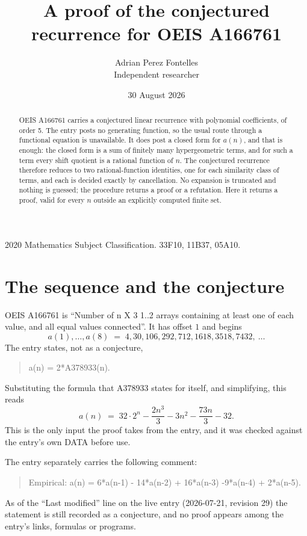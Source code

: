 \documentclass[11pt,a4paper]{article}
\title{A proof of the conjectured recurrence for OEIS A166761}
\author{Adrian Perez Fontelles\\ \small Independent researcher}
\date{30 August 2026}
\theoremstyle{plain}
\theoremstyle{definition}
\begin{document}
\maketitle

\begin{abstract}
OEIS A166761 carries a conjectured linear recurrence with polynomial coefficients, of
order 5. The entry posts no generating function, so the usual route through a
functional equation is unavailable. It does post a closed form for $a(n)$, and that is
enough: the closed form is a sum of finitely many hypergeometric terms, and for such a
term every shift quotient is a rational function of $n$. The conjectured recurrence
therefore reduces to two rational-function identities, one for each similarity
class of terms, and each is decided exactly by cancellation. No expansion is truncated and
nothing is guessed; the procedure returns a proof or a refutation. Here it returns a proof,
valid for every $n$ outside an explicitly computed finite set.
\end{abstract}

\noindent\small 2020 Mathematics Subject Classification. 33F10, 11B37, 05A10.\normalsize

\section{The sequence and the conjecture}

OEIS A166761 is ``Number of n X 3 1..2 arrays containing at least one of each value, and all equal values connected''. It has offset $1$ and begins
\[
a(1),\dots,a(8)\;=\;4, 30, 106, 292, 712, 1618, 3518, 7432,\ \dots
\]
The entry states, not as a conjecture,
\begin{quote}\small
a(n) = 2*A378933(n).
\end{quote}
Substituting the formula that A378933 states for itself, and simplifying, this reads
\begin{equation}\label{eq:cf}
a(n)\;=\;32 \cdot 2^{n} - \frac{2 n^{3}}{3} - 3 n^{2} - \frac{73 n}{3} - 32 .
\end{equation}
This is the only input the proof takes from the entry, and it was checked against the
entry's own DATA before use.

The entry separately carries the following comment:
\begin{quote}\small
Empirical: a(n) = 6*a(n-1) - 14*a(n-2) + 16*a(n-3) -9*a(n-4) + 2*a(n-5).
\end{quote}
As of the ``Last modified'' line on the live entry (2026-07-21, revision 29) the
statement is still recorded as a conjecture, and no proof appears among the entry's links,
formulas or programs.
\end{document}
